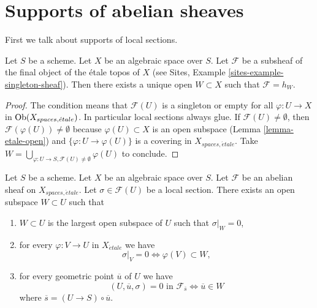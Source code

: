 \section{Supports of abelian sheaves}
\label{section-support}

\noindent
First we talk about supports of local sections.

\begin{lemma}
\label{lemma-support-subsheaf-final}
Let $S$ be a scheme. Let $X$ be an algebraic space over $S$.
Let $\mathcal{F}$ be a subsheaf of the final object of the \'etale
topos of $X$ (see
Sites, Example \ref{sites-example-singleton-sheaf}).
Then there exists a unique open
$W \subset X$ such that $\mathcal{F} = h_W$.
\end{lemma}

\begin{proof}
The condition means that $\mathcal{F}(U)$ is a singleton or
empty for all $\varphi : U \to X$ in $\mathop{\rm Ob}\nolimits(X_{spaces, \acute{e}tale})$.
In particular local sections always glue. If
$\mathcal{F}(U) \not = \emptyset$, then
$\mathcal{F}(\varphi(U)) \not = \emptyset$ because
$\varphi(U) \subset X$ is an open subspace
(Lemma \ref{lemma-etale-open})
and
$\{\varphi : U \to \varphi(U)\}$ is a covering in $X_{spaces, \acute{e}tale}$.
Take
$W = \bigcup_{\varphi : U \to S, \mathcal{F}(U) \not = \emptyset} \varphi(U)$
to conclude.
\end{proof}

\begin{lemma}
\label{lemma-zero-over-image}
Let $S$ be a scheme.
Let $X$ be an algebraic space over $S$.
Let $\mathcal{F}$ be an abelian sheaf on $X_{spaces, \acute{e}tale}$.
Let $\sigma \in \mathcal{F}(U)$ be a local section.
There exists an open subspace $W \subset U$ such that
\begin{enumerate}
\item $W \subset U$ is the largest open subspace of $U$ such
that $\sigma|_W = 0$,
\item for every $\varphi : V \to U$ in $X_{\acute{e}tale}$ we have
$$
\sigma|_V = 0 \Leftrightarrow \varphi(V) \subset W,
$$
\item for every geometric point $\overline{u}$ of $U$ we have
$$
(U, \overline{u}, \sigma) = 0\text{ in }\mathcal{F}_{\overline{s}}
\Leftrightarrow
\overline{u} \in W
$$
where $\overline{s} = (U \to S) \circ \overline{u}$.
\end{enumerate}
\end{lemma}

